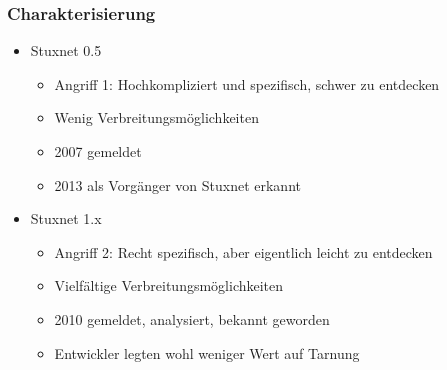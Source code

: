 \documentclass{beamer}
\begin{document}
\begin{frame}
  \frametitle{Charakterisierung}
  \begin{itemize}
    \item Stuxnet 0.5
      \begin{itemize}
        \item Angriff 1: Hochkompliziert und spezifisch, schwer zu entdecken
        \item Wenig Verbreitungsmöglichkeiten
        \item 2007 gemeldet
        \item 2013 als Vorgänger von Stuxnet erkannt
      \end{itemize}
    \item Stuxnet 1.x
      \begin{itemize}
        \item Angriff 2: Recht spezifisch, aber eigentlich leicht zu entdecken
        \item Vielfältige Verbreitungsmöglichkeiten
        \item 2010 gemeldet, analysiert, bekannt geworden
        \item Entwickler legten wohl weniger Wert auf Tarnung
      \end{itemize}
  \end{itemize}
\end{frame}
\end{document}
